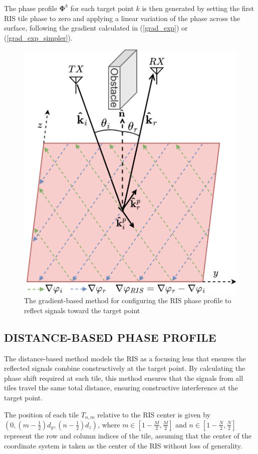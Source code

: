 \documentclass{IEEEoj}
\begin{document}
The phase profile $\mathbf{\Phi}^k$ for each target point $k$ is then generated by setting the first RIS tile phase to zero and applying a linear variation of the phase across the surface, following the gradient calculated in (\ref{grad_exp}) or (\ref{grad_exp_simpler}). 

\begin{figure}
	\centering \includegraphics[width=.8\linewidth]{RIS_Phase_Gradient.png}
	\caption{The gradient-based method for configuring the RIS phase profile to reflect signals toward the target point}
	\label{RIS_Phase_Gradient}
\end{figure}

\subsection{DISTANCE-BASED PHASE PROFILE}
The distance-based method models the RIS as a focusing lens that ensures the reflected signals combine constructively at the target point. By calculating the phase shift required at each tile, this method ensures that the signals from all tiles travel the same total distance, ensuring constructive interference at the target point.

The position of each tile $T_{n,m}$ relative to the RIS center is given by $(0, (m-\frac{1}{2})d_y, (n-\frac{1}{2})d_z)$, where $m \in \left[ 1 - \frac{M}{2}, \frac{M}{2} \right]$ and $n \in \left[ 1 - \frac{N}{2}, \frac{N}{2} \right]$ represent the row and column indices of the tile, assuming that the center of the coordinate system is taken as the center of the RIS without loss of generality.
\end{document}
